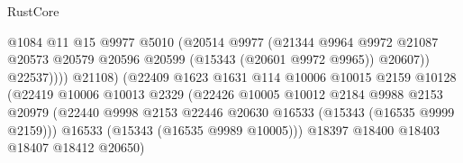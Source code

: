 \begin{lexlean}{RustCore}
\begin{coremodule}
                                            @1084
                                            @11
                                            @15
                                            @9977
                                            @5010
                                            (@20514
                                              @9977
                                              (@21344
                                                @9964
                                                @9972
                                                @21087
                                                @20573
                                                @20579
                                                @20596
                                                @20599
                                                (@15343 (@20601 @9972 @9965))
                                                @20607))
                                            @22537))))
                                    @21108)
                                  (@22409
                                    @1623
                                    @1631
                                    @114
                                    @10006
                                    @10015
                                    @2159
                                    @10128
                                    (@22419
                                      @10006
                                      @10013
                                      @2329
                                      (@22426
                                        @10005
                                        @10012
                                        @2184
                                        @9988
                                        @2153
                                        @20979
                                        (@22440
                                          @9998
                                          @2153
                                          @22446
                                          @20630
                                          @16533
                                          (@15343 (@16535 @9999 @2159)))
                                        @16533
                                        (@15343 (@16535 @9989 @10005)))
                                      @18397
                                      @18400
                                      @18403
                                      @18407
                                      @18412
                                      @20650)

\end{coremodule}
\end{lexlean}
